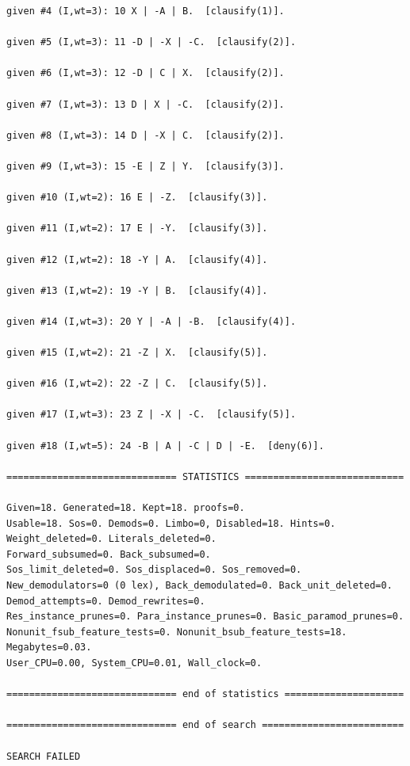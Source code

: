 \documentclass[fullpage]{article}
\begin{document}
{\begin{verbatim}
given #4 (I,wt=3): 10 X | -A | B.  [clausify(1)].

given #5 (I,wt=3): 11 -D | -X | -C.  [clausify(2)].

given #6 (I,wt=3): 12 -D | C | X.  [clausify(2)].

given #7 (I,wt=3): 13 D | X | -C.  [clausify(2)].

given #8 (I,wt=3): 14 D | -X | C.  [clausify(2)].

given #9 (I,wt=3): 15 -E | Z | Y.  [clausify(3)].

given #10 (I,wt=2): 16 E | -Z.  [clausify(3)].

given #11 (I,wt=2): 17 E | -Y.  [clausify(3)].

given #12 (I,wt=2): 18 -Y | A.  [clausify(4)].

given #13 (I,wt=2): 19 -Y | B.  [clausify(4)].

given #14 (I,wt=3): 20 Y | -A | -B.  [clausify(4)].

given #15 (I,wt=2): 21 -Z | X.  [clausify(5)].

given #16 (I,wt=2): 22 -Z | C.  [clausify(5)].

given #17 (I,wt=3): 23 Z | -X | -C.  [clausify(5)].

given #18 (I,wt=5): 24 -B | A | -C | D | -E.  [deny(6)].

============================== STATISTICS ============================

Given=18. Generated=18. Kept=18. proofs=0.
Usable=18. Sos=0. Demods=0. Limbo=0, Disabled=18. Hints=0.
Weight_deleted=0. Literals_deleted=0.
Forward_subsumed=0. Back_subsumed=0.
Sos_limit_deleted=0. Sos_displaced=0. Sos_removed=0.
New_demodulators=0 (0 lex), Back_demodulated=0. Back_unit_deleted=0.
Demod_attempts=0. Demod_rewrites=0.
Res_instance_prunes=0. Para_instance_prunes=0. Basic_paramod_prunes=0.
Nonunit_fsub_feature_tests=0. Nonunit_bsub_feature_tests=18.
Megabytes=0.03.
User_CPU=0.00, System_CPU=0.01, Wall_clock=0.

============================== end of statistics =====================

============================== end of search =========================

SEARCH FAILED

\end{verbatim} }
\end{document}
